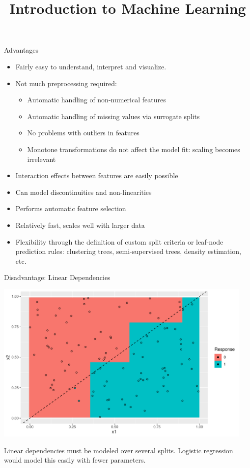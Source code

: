 \documentclass[11pt,compress,t,notes=noshow, xcolor=table]{beamer}
\title{Introduction to Machine Learning}
\begin{document}

\begin{vbframe}{Advantages}
  \begin{itemize}
    \item Fairly easy to understand, interpret and visualize.
    \item Not much preprocessing required:
    \begin{itemize}
      \item Automatic handling of non-numerical features
      \item Automatic handling of missing values via surrogate splits
      \item No problems with outliers in features
      \item Monotone transformations do not affect the model fit: scaling becomes irrelevant
    \end{itemize}
    \item Interaction effects between features are easily possible
    \item Can model discontinuities and non-linearities
    \item Performs automatic feature selection
    \item Relatively fast, scales well with larger data
    \item Flexibility through the definition of custom split criteria or leaf-node prediction rules: clustering trees, semi-supervised trees, density estimation, etc.
    \end{itemize}
\end{vbframe}

\begin{vbframe}{Disadvantage: Linear Dependencies}

{\centering \includegraphics[width=0.95\textwidth]{figure/cart_dis_1} 

}


Linear dependencies must be modeled over several splits. 
Logistic regression would model this easily with fewer parameters.
\end{vbframe}
\end{document}
